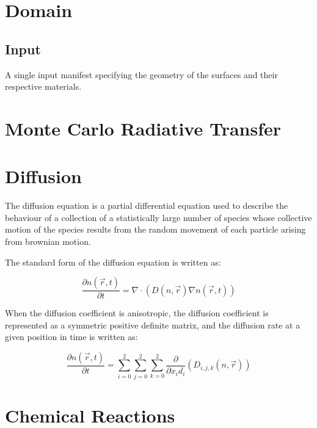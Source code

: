 \documentclass{article}
\begin{document}
\newpage
\begin{multicols}{2}

    \section{Domain}
    \subsection{Input}
    A single input manifest specifying the geometry of the surfaces and their respective materials.

    \section{Monte Carlo Radiative Transfer}

    \section{Diffusion}
    The diffusion equation is a partial differential equation used to describe the behaviour of a collection of a statistically large number of species whose collective motion of the species results from the random movement of each particle arising from brownian motion.

    The standard form of the diffusion equation is written as:

    \begin{equation} \label{eq:diff_eq}
        \frac{\partial n(\vec{r}, t)}{\partial t} = \nabla \cdot ( D(n, \vec{r}) \nabla n(\vec{r}, t))
    \end{equation}

    When the diffusion coefficient is anisotropic, the diffusion coefficient is represented as a symmetric positive definite matrix, and the diffusion rate at a given position in time is written as:

    \begin{equation} \label{eq:diff_eq}
        \frac{\partial n(\vec{r}, t)}{\partial t} = \sum_{i=0}^{2} \sum_{j=0}^{2} \sum_{k=0}^{2} \frac{\partial}{\partial x_i d_i} ( D_{i,j,k}(n, \vec{r}) )
    \end{equation}

    \section{Chemical Reactions}

\end{multicols}
\end{document}
